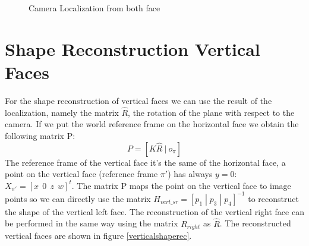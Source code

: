 \documentclass[11pt, oneside]{article}   	%
\begin{document}
\begin{figure}[H] 
 \centering
    \qquad
      \qquad
    \caption{Camera Localization from both face}%
    \label{general_loc}%
\end{figure}

\section{Shape Reconstruction Vertical Faces }
For the shape reconstruction of vertical faces we can use the result of the localization, namely the matrix $\hat{R}$, the rotation of the plane with respect to the camera.
If we put the world reference frame on the horizontal face we obtain the following matrix P:
$$ P = [K \hat{R} \  | \ o_\pi ] $$
The reference frame of the vertical face it's the same of the horizontal face, a point on the vertical face (reference frame $\pi'$) has always $y=0$: $X_{\pi'} = [x \ \ 0 \ \ z \ \  w]^t$.
The matrix P maps the point on the vertical face to image points so we can directly use the matrix $ H_{vert\_sr} = [p_1 \; |\; p_3 \;|\; p_4]^{-1}$ to reconstruct the shape of the vertical left face.
The reconstruction of the vertical right face can be performed in the same way using the matrix $R_{right}$ as $\hat{R}$.
The reconstructed  vertical faces are shown in figure \ref{verticalshaperec}.
\end{document}
